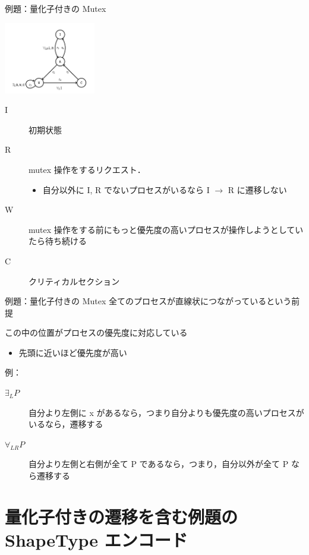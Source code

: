\documentclass[presentation, xetex]{beamer}
\begin{document}
\begin{frame}[label={sec:orgf0fd196}]{例題：量化子付きの Mutex}
\begin{center}
\includegraphics[width=0.3\textwidth]{./images/priority-mutex.png}
\end{center}



\begin{description}
\item[{I}] 初期状態
\item[{R}] mutex 操作をするリクエスト．
\begin{itemize}
\item 自分以外に I, R でないプロセスがいるなら I \(\longrightarrow\) R に遷移しない
\end{itemize}
\item[{W}] mutex 操作をする前にもっと優先度の高いプロセスが操作しようとしていたら待ち続ける
\item[{C}] クリティカルセクション
\end{description}
\end{frame}


\begin{frame}[label={sec:org528a844}]{例題：量化子付きの Mutex}
全てのプロセスが直線状につながっているという前提

この中の位置がプロセスの優先度に対応している
\begin{itemize}
\item 先頭に近いほど優先度が高い
\end{itemize}


例：
\begin{description}
\item[{\(\exists_{L} P\)}] 自分より左側に x があるなら，つまり自分よりも優先度の高いプロセスがいるなら，遷移する

\item[{\(\forall_{LR} P\)}] 自分より左側と右側が全て P であるなら，つまり，自分以外が全て P なら遷移する
\end{description}
\end{frame}


\section{量化子付きの遷移を含む例題の ShapeType エンコード}
\label{sec:org2bb755a}
\end{document}

